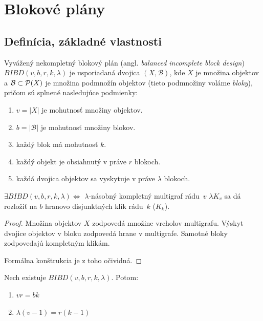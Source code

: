 \chapter{Blokové plány}

\section{Definícia, základné vlastnosti}

\begin{definition}

Vyvážený nekompletný blokový plán (angl. \emph{balanced incomplete block design}) $BIBD(v, b, r, k, \lambda)$ je usporiadaná dvojica $(X, \mathcal{B})$, kde $X$ je množina objektov a $\mathcal{B} \subset \mathcal{P}(X)$ je množina podmnožín objektov (tieto podmnožiny voláme \emph{bloky}), pričom sú splnené nasledujúce podmienky:

\begin{enumerate}
    \item $v = |X|$ je mohutnosť množiny objektov.
    \item $b = |\mathcal{B}|$ je mohutnosť množiny blokov.
    \item každý blok má mohutnosť $k$.
    \item každý objekt je obsiahnutý v práve $r$ blokoch.
    \item každá dvojica objektov sa vyskytuje v práve $\lambda$ blokoch. 
\end{enumerate}
\end{definition}

\begin{theorem}
$\exists BIBD(v, b, r, k, \lambda) \Longleftrightarrow $ $\lambda$-násobný kompletný multigraf rádu~$v$ $\lambda K_v$
sa dá rozložiť na $b$ hranovo disjunktných klík rádu~$k$ ($K_k$).
\end{theorem}


\begin{proof}
Množina objektov $X$ zodpovedá množine vrcholov multigrafu. 
Výskyt dvojice objektov v bloku zodpovedá hrane v multigrafe.
Samotné bloky zodpovedajú kompletným klikám.

Formálna konštrukcia je z toho očividná.
\end{proof}

\begin{theorem}
\label{th:bibd_params}
Nech existuje $BIBD(v, b, r, k, \lambda)$. Potom:
\begin{enumerate}
    \item $vr = bk$
    \item $\lambda (v-1) = r (k-1)$
\end{enumerate}
\end{theorem}


